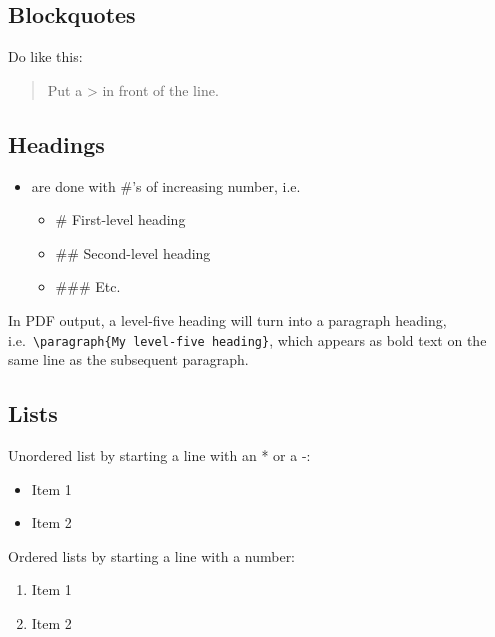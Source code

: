 \documentclass[a4paper, twoside]{templates/ociamthesis}
\providecommand{\tightlist}{%
  \setlength{\itemsep}{0pt}\setlength{\parskip}{0pt}}
\begin{document}
\hypertarget{blockquotes}{%
\subsection{Blockquotes}\label{blockquotes}}

Do like this:

\begin{quote}
Put a \textgreater{} in front of the line.
\end{quote}

\hypertarget{headings}{%
\subsection{Headings}\label{headings}}

\begin{itemize}
\tightlist
\item
  are done with \#'s of increasing number, i.e.~

  \begin{itemize}
  \tightlist
  \item
    \# First-level heading
  \item
    \#\# Second-level heading
  \item
    \#\#\# Etc.
  \end{itemize}
\end{itemize}

In PDF output, a level-five heading will turn into a paragraph heading, i.e.~\texttt{\textbackslash{}paragraph\{My\ level-five\ heading\}}, which appears as bold text on the same line as the subsequent paragraph.

\hypertarget{lists}{%
\subsection{Lists}\label{lists}}

Unordered list by starting a line with an * or a -:

\begin{itemize}
\tightlist
\item
  Item 1
\item
  Item 2
\end{itemize}

Ordered lists by starting a line with a number:

\begin{enumerate}
\def\labelenumi{\arabic{enumi}.}
\tightlist
\item
  Item 1
\item
  Item 2
\end{enumerate}
\end{document}
